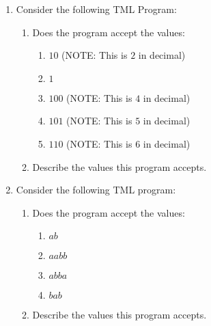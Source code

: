 \begin{enumerate}
    \item Consider the following TML Program:
    

    \begin{enumerate}
        \item Does the program accept the values:
        \begin{enumerate}
            \item $10$ (NOTE: This is $2$ in decimal)
            \item $1$
            \item $100$ (NOTE: This is $4$ in decimal)
            \item $101$ (NOTE: This is $5$ in decimal)
            \item $110$ (NOTE: This is $6$ in decimal)
        \end{enumerate}
        \item Describe the values this program accepts.
    \end{enumerate}
    \newpage

    \item Consider the following TML program:
    
    \begin{enumerate}
        \item Does the program accept the values:
        \begin{enumerate}
            \item $ab$
            \item $aabb$
            \item $abba$
            \item $bab$
        \end{enumerate}
        
        \item Describe the values this program accepts.
    \end{enumerate}
\end{enumerate}

\newpage

